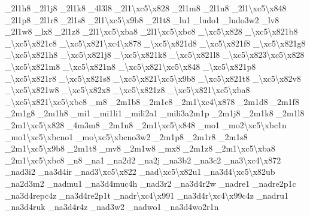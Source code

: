 \begin{DoxyCompactItemize}
\-\_\-2l1h8 \-\_\-2l1j8 \-\_\-2l1k8 \-\_\-4l3l8 \-\_\-2l1\textbackslash{}xc5\textbackslash{}x828 \-\_\-2l1m8 \-\_\-2l1n8 \-\_\-2l1\textbackslash{}xc5\textbackslash{}x848 \-\_\-2l1p8 \-\_\-2l1r8 \-\_\-2l1s8 \-\_\-2l1\textbackslash{}xc5\textbackslash{}x9b8 \-\_\-2l1t8 \-\_\-lu1 \-\_\-ludo1 \-\_\-ludo3w2 \-\_\-lv8 \-\_\-2l1w8 \-\_\-lx8 \-\_\-2l1z8 \-\_\-2l1\textbackslash{}xc5\textbackslash{}xba8 \-\_\-2l1\textbackslash{}xc5\textbackslash{}xbc8 \-\_\-\textbackslash{}xc5\textbackslash{}x828 \-\_\textbackslash{}xc5\textbackslash{}x821b8 \-\_\textbackslash{}xc5\textbackslash{}x821c8 \-\_\textbackslash{}xc5\textbackslash{}x821\textbackslash{}xc4\textbackslash{}x878 \-\_\textbackslash{}xc5\textbackslash{}x821d8 \-\_\textbackslash{}xc5\textbackslash{}x821f8 \-\_\textbackslash{}xc5\textbackslash{}x821g8 \-\_\textbackslash{}xc5\textbackslash{}x821h8 \-\_\textbackslash{}xc5\textbackslash{}x821j8 \-\_\textbackslash{}xc5\textbackslash{}x821k8 \-\_\textbackslash{}xc5\textbackslash{}x821l8 \-\_\textbackslash{}xc5\textbackslash{}x823\textbackslash{}xc5\textbackslash{}x828 \-\_\textbackslash{}xc5\textbackslash{}x821m8 \-\_\textbackslash{}xc5\textbackslash{}x821n8 \-\_\textbackslash{}xc5\textbackslash{}x821\textbackslash{}xc5\textbackslash{}x848 \-\_\textbackslash{}xc5\textbackslash{}x821p8 \-\_\textbackslash{}xc5\textbackslash{}x821r8 \-\_\textbackslash{}xc5\textbackslash{}x821s8 \-\_\textbackslash{}xc5\textbackslash{}x821\textbackslash{}xc5\textbackslash{}x9b8 \-\_\textbackslash{}xc5\textbackslash{}x821t8 \-\_\-\textbackslash{}xc5\textbackslash{}x82v8 \-\_\textbackslash{}xc5\textbackslash{}x821w8 \-\_\-\textbackslash{}xc5\textbackslash{}x82x8 \-\_\textbackslash{}xc5\textbackslash{}x821z8 \-\_\textbackslash{}xc5\textbackslash{}x821\textbackslash{}xc5\textbackslash{}xba8 \-\_\textbackslash{}xc5\textbackslash{}x821\textbackslash{}xc5\textbackslash{}xbc8 \-\_\-m8 \-\_\-2m1b8 \-\_\-2m1c8 \-\_\-2m1\textbackslash{}xc4\textbackslash{}x878 \-\_\-2m1d8 \-\_\-2m1f8 \-\_\-2m1g8 \-\_\-2m1h8 \-\_\-mi1 \-\_\-mi1li1 \-\_\-mili2a1 \-\_\-mili3a2m1p \-\_\-2m1j8 \-\_\-2m1k8 \-\_\-2m1l8 \-\_\-2m1\textbackslash{}xc5\textbackslash{}x828 \-\_\-4m3m8 \-\_\-2m1n8 \-\_\-2m1\textbackslash{}xc5\textbackslash{}x848 \-\_\-mo1 \-\_\-mo2\textbackslash{}xc5\textbackslash{}xbc1n \-\_\-mo1\textbackslash{}xc5\textbackslash{}xbcno1 \-\_\-mo\textbackslash{}xc5\textbackslash{}xbcno3w2 \-\_\-2m1p8 \-\_\-2m1r8 \-\_\-2m1s8 \-\_\-2m1\textbackslash{}xc5\textbackslash{}x9b8 \-\_\-2m1t8 \-\_\-mv8 \-\_\-2m1w8 \-\_\-mx8 \-\_\-2m1z8 \-\_\-2m1\textbackslash{}xc5\textbackslash{}xba8 \-\_\-2m1\textbackslash{}xc5\textbackslash{}xbc8 \-\_\-n8 \-\_\-na1 \-\_\-na2d2 \-\_\-na2j \-\_\-na3b2 \-\_\-na3c2 \-\_\-na3\textbackslash{}xc4\textbackslash{}x872 \-\_\-nad3i2 \-\_\-na3d4ir \-\_\-nad3\textbackslash{}xc5\textbackslash{}x822 \-\_\-nad\textbackslash{}xc5\textbackslash{}x82u1 \-\_\-na3d4\textbackslash{}xc5\textbackslash{}x82ub \-\_\-na2d3m2 \-\_\-nadmu1 \-\_\-na3d4muc4h \-\_\-nad3r2 \-\_\-na3d4r2w \-\_\-nadre1 \-\_\-nadre2p1c \-\_\-na3d4repc4z \-\_\-na3d4re2p1t \-\_\-nadr\textbackslash{}xc4\textbackslash{}x991 \-\_\-na3d4r\textbackslash{}xc4\textbackslash{}x99c4z \-\_\-nadru1 \-\_\-na3d4ruk \-\_\-na3d4r4z \-\_\-nad3w2 \-\_\-nadwo1 \-\_\-na3d4wo2r1n 
\end{DoxyCompactItemize}
